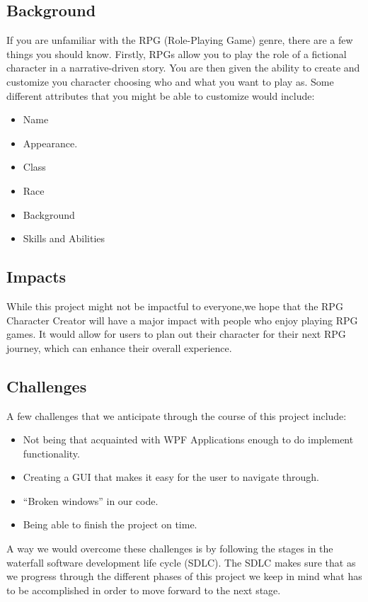 \documentclass[10pt,conference,onecolumn,compsoc]{IEEEtran}
\begin{document}
\subsection{Background}
If you are unfamiliar with the RPG (Role-Playing Game) genre, there are a few things you should know. Firstly, RPGs allow you to play the role of a fictional character in a narrative-driven story. You are then given the ability to create and customize you character choosing who and what you want to play as. Some different attributes that you might be able to customize would include:
\begin{itemize}
\item Name
\item Appearance.
\item Class
\item Race
\item Background
\item Skills and Abilities
\end{itemize}

\subsection{Impacts}
While this project might not be impactful to everyone,we hope that the RPG Character Creator will have a major impact with people who enjoy playing RPG games. It would allow for users to plan out their character for their next RPG journey, which can enhance their overall experience.

\subsection{Challenges}
A few challenges that we anticipate through the course of this project include:
\begin{itemize} 
\item Not being that acquainted with WPF Applications enough to do implement functionality.
\item Creating a GUI that makes it easy for the user to navigate through.
\item “Broken windows” in our code.
\item Being able to finish the project on time.
\end{itemize}

A way we would overcome these challenges is by following the stages in the waterfall software development life cycle (SDLC). The SDLC makes sure that as we progress through the different phases of this project we keep in mind what has to be accomplished in order to move forward to the next stage.
\end{document}
